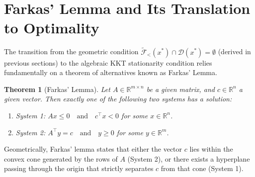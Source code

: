 \documentclass[11pt]{article}
\theoremstyle{definition}
\theoremstyle{plain}
\newtheorem{theorem}{Theorem}
\theoremstyle{remark}
\begin{document}
\section{Farkas' Lemma and Its Translation to Optimality}
\label{sec:farkas}

The transition from the geometric condition $\widetilde{\mathcal{F}}_{<}(x^*) \cap \mathcal{D}(x^*) = \emptyset$ (derived in previous sections) to the algebraic KKT stationarity condition relies fundamentally on a theorem of alternatives known as Farkas' Lemma.

\begin{theorem}[Farkas' Lemma]
  Let $A \in \mathbb{R}^{m \times n}$ be a given matrix, and $c \in \mathbb{R}^n$ a given vector. Then exactly one of the following two systems has a solution:
  \begin{enumerate}
    \item System 1: $Ax \leq 0 \quad \text{and} \quad c^\top x < 0$ for some $x \in \mathbb{R}^n$.
    \item System 2: $A^\top y = c \quad \text{and} \quad y \geq 0$ for some $y \in \mathbb{R}^m$.
  \end{enumerate}
\end{theorem}

Geometrically, Farkas' lemma states that either the vector $c$ lies within the convex cone generated by the rows of $A$ (System 2), or there exists a hyperplane passing through the origin that strictly separates $c$ from that cone (System 1).
\end{document}
